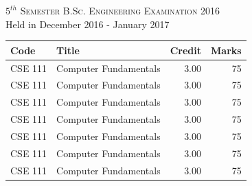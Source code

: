 \documentclass[11pt]{article}
\begin{document}
\begin{table}[ht]
\begin{minipage}[b]{0.35\textwidth}
\smallskip
\textsc{$5^{th}$ Semester B.Sc. Engineering Examination 2016}\\
{Held in December 2016 - January 2017}\\
\end{minipage}
\hspace{0.2cm}
\begin{minipage}[m]{0.3\linewidth} \flushright
\vspace*{-1in} %
\begin{small}
\renewcommand{\arraystretch}{1.01}
\begin{tabular} {|l|l|r|r|}
	\hline \hline Code & Title  & Credit &  Marks \\ \hline
	\hline CSE 111 & Computer Fundamentals  & 3.00 & 75 \\
	\hline CSE 111 & Computer Fundamentals  & 3.00 & 75 \\
	\hline CSE 111 & Computer Fundamentals  & 3.00 & 75 \\
	\hline CSE 111 & Computer Fundamentals  & 3.00 & 75 \\
	\hline CSE 111 & Computer Fundamentals  & 3.00 & 75 \\
	\hline CSE 111 & Computer Fundamentals  & 3.00 & 75 \\
	\hline CSE 111 & Computer Fundamentals  & 3.00 & 75 \\
	\hline
\end{tabular}
\end{small} 
\end{minipage}
\end{table}
\vspace*{-0.5cm}
\end{document}
